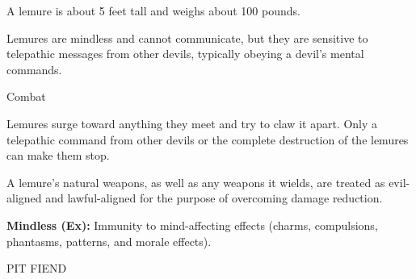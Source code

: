\documentclass{article}
\begin{document}
A lemure is about 5 feet tall and weighs about 100 pounds.

Lemures are mindless and cannot communicate, but they are sensitive to telepathic 
messages from other devils, typically obeying a devil's mental commands.

Combat

Lemures surge toward anything they meet and try to claw it apart. Only a telepathic 
command from other devils or the complete destruction of the lemures can make them 
stop.

A lemure's natural weapons, as well as any weapons it wields, are treated as evil-aligned 
and lawful-aligned for the purpose of overcoming damage reduction.

\textbf{Mindless (Ex):} Immunity to mind-affecting effects (charms, compulsions, 
phantasms, patterns, and morale effects).

\vspace{12pt}
PIT FIEND
\end{document}
